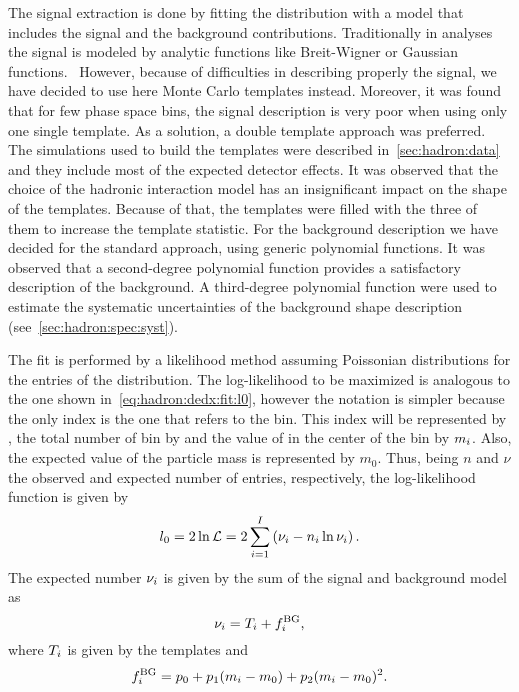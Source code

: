 The signal extraction is done by fitting the \minv distribution
with a model that includes the signal and the background contributions.
Traditionally in \NASixtyOne analyses the signal
is modeled by analytic functions like Breit-Wigner
or Gaussian functions.~\cite{Abgrall:2015hmv,Aduszkiewicz:2015dmr} 
However, because of difficulties in describing properly
the \kzeros signal, we have decided to use here
Monte Carlo templates instead. Moreover, it was found
that for few \kzeros phase space bins,
the signal description is very poor
when using only one single template.
As a solution, a double template approach
was preferred.
The simulations used to build the templates were described
in~\cref{sec:hadron:data} and they include most of the expected
detector effects. It was observed that the choice of the
hadronic interaction model has an insignificant impact
on the shape of the templates. Because of that,
the templates were filled with the three of them
to increase the template statistic.
For the background description we have decided
for the standard approach, using generic polynomial functions.
It was observed that a second-degree polynomial function
provides a satisfactory description of the background.
A third-degree polynomial function were used to estimate
the systematic uncertainties of the background shape description
(see~\cref{sec:hadron:spec:syst}).


The fit is performed by a likelihood method assuming Poissonian
distributions for the entries of the \minv distribution.
The log-likelihood to be maximized is analogous to the one shown
in~\cref{eq:hadron:dedx:fit:l0}, however the notation is
simpler because the only index is the one
that refers to the \minv bin. This index will be represented by \imass,
the total number of \minv bin by \nmass and the value of \minv in the center
of the bin by $m_i$. Also, the expected value of the particle mass
is represented by $m_0$.
Thus, being $n$ and $\nu$ the observed and expected number of entries,
respectively, the log-likelihood function is given by
\begin{equation}
  l_0 = 2\ln \mathcal{L} = 2\sum_{i=1}^{I} \left(\nu_{i} - n_{i}\ln\nu_{i}\right). 
  \label{eq:hadron:vzero:fit:l0}
\end{equation}
The expected number $\nu_i$ is given by the sum of the signal
and background model as
\begin{equation}
  \nu_i = T_i + f^\text{BG}_i, 
  \label{eq:hadron:vzero:fit:nu}
\end{equation}
where $T_i$ is given by the templates and
\begin{equation}
  f^\text{BG}_i = p_0 + p_1(m_i-m_0)+p_2(m_i-m_0)^2.
  \label{eq:hadron:vzero:fit:bg}
\end{equation}

